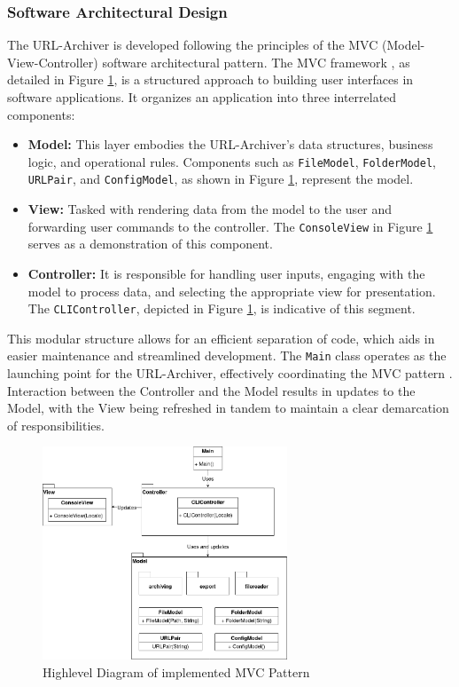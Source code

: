 \subsubsection{Software Architectural Design}
The URL-Archiver is developed following the principles of the MVC (Model-View-Controller)  software architectural pattern. The MVC framework , as detailed in Figure \ref{fig:MVC_Highlevel}, is a structured approach to building user interfaces in software applications. It organizes an application into three interrelated components:

\begin{itemize}
	\item \textbf{Model:} This layer embodies the URL-Archiver's data structures, business logic, and operational rules. Components such as \texttt{FileModel}, \texttt{FolderModel}, \texttt{URLPair}, and \texttt{ConfigModel}, as shown in Figure \ref{fig:MVC_Highlevel}, represent the model.
	\item \textbf{View:} Tasked with rendering data from the model to the user and forwarding user commands to the controller. The \texttt{ConsoleView} in Figure \ref{fig:MVC_Highlevel} serves as a demonstration of this component.
	\item \textbf{Controller:} It is responsible for handling user inputs, engaging with the model to process data, and selecting the appropriate view for presentation. The \texttt{CLIController}, depicted in Figure \ref{fig:MVC_Highlevel}, is indicative of this segment.
\end{itemize}

This modular structure allows for an efficient separation of code, which aids in easier maintenance and streamlined development. The \texttt{Main} class operates as the launching point for the URL-Archiver, effectively coordinating the MVC pattern . Interaction between the Controller and the Model results in updates to the Model, with the View being refreshed in tandem to maintain a clear demarcation of responsibilities.

\begin{figure}[h!]
    \center
    \includegraphics[width=0.65\textwidth]{diagrams/mvc_diagram-Highlevel_MVC.png}
    \caption{Highlevel Diagram of implemented MVC Pattern }
    \label{fig:MVC_Highlevel}
\end{figure}
\clearpage

